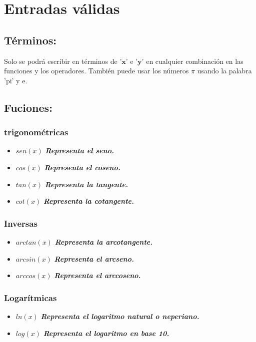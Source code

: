 \documentclass{article}
\begin{document}
\section{Entradas válidas}
\subsection{Términos:}
Solo se podrá escribir en términos de '$\textbf{x}$' e '$\textbf{y}$' en cualquier combinación en las funciones y los operadores. También puede usar los números $\pi$ usando la palabra 'pi' y e. 
\subsection{Fuciones:}
\subsubsection{trigonométricas}
\begin{itemize}
    \item $sen(x)$  \textbf{\textit{Representa el seno.}}
    \item $cos(x)$  \textbf{\textit{Representa el coseno.}}

    \item $tan(x)$  \textbf{\textit{Representa la tangente.}}
    \item $cot(x)$  \textbf{\textit{Representa la cotangente.}}
   
\end{itemize}
\subsubsection{Inversas}
\begin{itemize}
     \item $arctan(x)$  \textbf{\textit{Representa la arcotangente.}}
     \item $arcsin(x)$ \textbf{\textit{Representa el arcseno.}}
     \item  $arccos(x)$ \textbf{\textit{Representa el arccoseno.}}
\end{itemize}
\subsubsection{Logarítmicas}
\begin{itemize}
    \item $ln(x)$  \textbf{\textit{Representa el logaritmo natural o neperiano.}}
    \item $log(x)$  \textbf{\textit{Representa el logaritmo en base 10.}}
\end{itemize}
\end{document}
